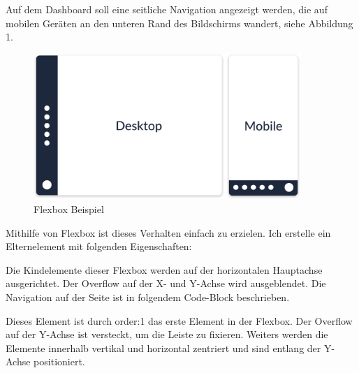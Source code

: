 Auf dem Dashboard soll eine seitliche Navigation angezeigt werden, die
auf mobilen Geräten an den unteren Rand des Bildschirms wandert, siehe
Abbildung 1.

\begin{figure}
\centering
\includegraphics[width=0.9\textwidth,height=\textheight]{bilder/Dominik/Flexbox_Illustration_1.png}
\caption{Flexbox Beispiel}
\end{figure}

Mithilfe von Flexbox ist dieses Verhalten einfach zu erzielen. Ich
erstelle ein Elternelement mit folgenden Eigenschaften:

\begin{Shaded}
\begin{Highlighting}[]
\NormalTok{\{}
  \NormalTok{: }\NormalTok{;}
\NormalTok{\}}
\end{Highlighting}
\end{Shaded}

Die Kindelemente dieser Flexbox werden auf der horizontalen Hauptachse
ausgerichtet. Der Overflow auf der X- und Y-Achse wird ausgeblendet. Die
Navigation auf der Seite ist in folgendem Code-Block beschrieben.

Dieses Element ist durch order:1 das erste Element in der Flexbox. Der
Overflow auf der Y-Achse ist versteckt, um die Leiste zu fixieren.
Weiters werden die Elemente innerhalb vertikal und horizontal zentriert
und sind entlang der Y-Achse positioniert.

\begin{Shaded}
\begin{Highlighting}[]
\NormalTok{\{}
  \NormalTok{: }\NormalTok{;}
  \NormalTok{: }\NormalTok{;}
  \NormalTok{: }\NormalTok{;}
\NormalTok{\}}
\end{Highlighting}
\end{Shaded}

